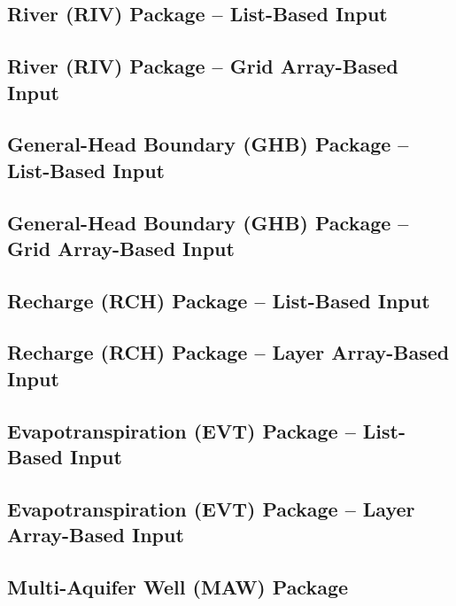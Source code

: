 \newpage
\subsection{River (RIV) Package -- List-Based Input}


\newpage
\subsection{River (RIV) Package -- Grid Array-Based Input}


\newpage
\subsection{General-Head Boundary (GHB) Package -- List-Based Input}


\newpage
\subsection{General-Head Boundary (GHB) Package -- Grid Array-Based Input}


\newpage
\subsection{Recharge (RCH) Package -- List-Based Input}


\newpage
\subsection{Recharge (RCH) Package -- Layer Array-Based Input}


\newpage
\subsection{Evapotranspiration (EVT) Package -- List-Based Input}


\newpage
\subsection{Evapotranspiration (EVT) Package -- Layer Array-Based Input}


\newpage
\subsection{Multi-Aquifer Well (MAW) Package}


\newpage
